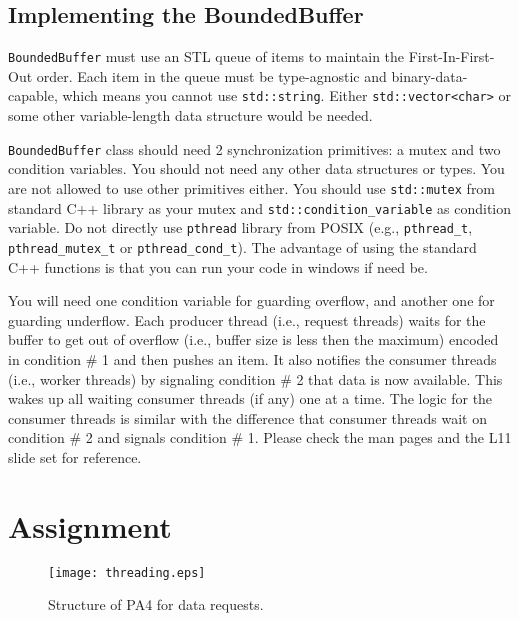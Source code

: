 \documentclass[12pt]{article}
\begin{document}
\subsection*{Implementing the BoundedBuffer}
\texttt{BoundedBuffer} must use an STL queue of items to maintain the First-In-First-Out order. Each item in the queue must be type-agnostic and binary-data-capable, which means you cannot use \texttt{std::string}. Either \texttt{std::vector<char>} or some other variable-length data structure would be needed.  

\texttt{BoundedBuffer} class should need 2 synchronization primitives: a mutex and two condition variables. You should not need any other data structures or types. You are not allowed to use other primitives either. You should use \texttt{std::mutex} from standard C++ library as your mutex and \texttt{std::condition\_variable} as condition variable. Do not directly use \texttt{pthread} library from POSIX (e.g., \texttt{pthread\_t}, \texttt{pthread\_mutex\_t} or \texttt{pthread\_cond\_t}). The advantage of using the standard C++ functions is that you can run your code in windows if need be. 


You will need one condition variable for guarding overflow, and another one for guarding underflow. Each producer thread (i.e., request threads) waits for the buffer to get out of overflow (i.e., buffer size is less then the maximum) encoded in condition \# 1 and then pushes an item. It also notifies the consumer threads (i.e., worker threads) by signaling condition \# 2 that data is now available. This wakes up all waiting consumer threads (if any) one at a time. The logic for the consumer threads is similar with the difference that consumer threads wait on condition \# 2 and signals condition \# 1. Please check the man pages and the L11 slide set for reference. 


\section*{Assignment}
\begin{figure}[t]\centering
	\texttt{[image: threading.eps]}
	\caption{Structure of PA4 for data requests.}
	\label{fig:PA3}
  \end{figure}
\end{document}
